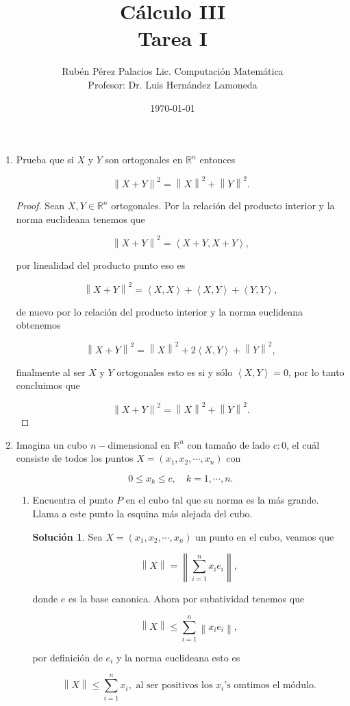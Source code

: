 \documentclass[letterpaper]{article}
\title{Cálculo III \\ Tarea I}
\author{Rubén Pérez Palacios Lic. Computación Matemática\\Profesor: Dr. Luis Hernández Lamoneda }
\date{\today}
\theoremstyle{definition}
\theoremstyle{lemathm}
\theoremstyle{lemathm}
\newtheorem{sol}{Solución}
\theoremstyle{lemathm}
\theoremstyle{lemademthm}
\newcommand{\pars}[1]{\left( #1 \right) }
\newcommand{\inprod}[1]{\left\langle #1 \right\rangle }
\newcommand{\norm}[1]{\left\lVert#1\right\rVert}
\newcommand{\RR}{\mathbb{R}}
\newcommand{\1}{\mathbbm{1}}
\begin{document}
	\maketitle

	\begin{enumerate}
		\item Prueba que si $X$ y $Y$ son ortogonales en $\RR^n$ entonces
		
		\[\norm{X+Y}^2 = \norm{X}^2 + \norm{Y}^2.\]

		\begin{proof}
			Sean $X,Y\in \RR^n$ ortogonales. Por la relación del producto interior y la norma euclideana tenemos que

			\[\norm{X+Y}^2 = \inprod{X+Y,X+Y},\]

			por linealidad del producto punto eso es

			\[\norm{X+Y}^2 = \inprod{X,X} + \inprod{X,Y} + \inprod{Y,Y},\]

			de nuevo por lo relación del producto interior y la norma euclideana obtenemos

			\[\norm{X+Y}^2 = \norm{X}^2 + 2\inprod{X,Y} + \norm{Y}^2,\]

			finalmente al ser $X$ y $Y$ ortogonales esto es si y sólo $\inprod{X,Y}=0$, por lo tanto concluimos que

			\[\norm{X+Y}^2 = \norm{X}^2 + \norm{Y}^2.\]
		\end{proof}
		\item Imagina un cubo $n-$dimensional en $\RR^n$ con tamaño de lado $c:0$, el cuál consiste de todos los puntos $X = \pars{x_1,x_2,\cdots,x_n}$ con
		
		\[0\leq x_k\leq c, \quad k=1,\cdots,n.\]

		\begin{enumerate}
			\item Encuentra el punto $P$ en el cubo tal que su norma es la más grande. Llama a este punto la esquina más alejada del cubo.
			\begin{sol}
				Sea $X = \pars{x_1,x_2,\cdots,x_n}$ un punto en el cubo, veamos que

				\[\norm{X} = \norm{\sum_{i=1}^n x_ie_i},\]

				donde $e$ es la base canonica. Ahora por subatividad tenemos que

				\[\norm{X} \leq \sum_{i=1}^n \norm{x_ie_i},\]

				por definición de $e_i$ y la norma euclideana esto es

				\[\norm{X} \leq \sum_{i=1}^n x_i, \text{ al ser positivos los $x_i$'s omtimos el módulo}.\]


\end{sol}
\end{enumerate}
\end{enumerate}
\end{document}

